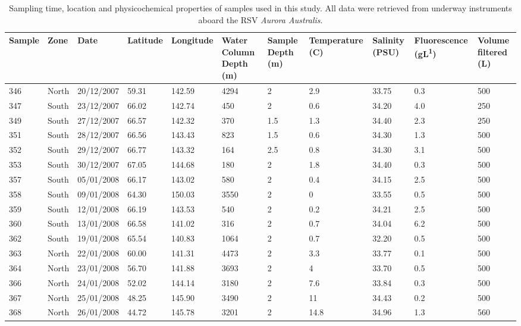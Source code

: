 \begin{sidewaystable}
\sffamily
\caption[Details of samples used in Polar Front study]{\sffamily{}Sampling time, location and physicochemical properties of samples used in this study.
All data were retrieved from underway instruments aboard the RSV \textit{Aurora Australis}.}
\label{tab:samplelist}
\smallskip
\begin{tabularx}{\textheight}{lllXXXXXXXX}
\toprule
\textbf{Sample} & \textbf{Zone} & \textbf{Date} & \textbf{Latitude} & \textbf{Longitude} & \textbf{Water \linebreak Column \linebreak Depth (m)} & \textbf{Sample Depth (m)} & \textbf{Temperature (\textdegree{}C)} & \textbf{Salinity (PSU)} & \textbf{Fluorescence \linebreak (\textmu{}gL\textsuperscript{\textminus{}1})} & \textbf{Volume \linebreak filtered (L)}\\
\midrule

346 & North & 20/12/2007 & \textminus{}59.31 & 142.59 & 4294 & 2 & 2.9 & 33.75 & 0.3 & 500\\
347 & South & 23/12/2007 & \textminus{}66.02 & 142.74 & 450 & 2 & 0.6 & 34.20 & 4.0 & 250\\
349 & South & 27/12/2007 & \textminus{}66.57 & 142.32 & 370 & 1.5 & \textminus{}1.3 & 34.40 & 2.3 & 250\\
351 & South & 28/12/2007 & \textminus{}66.56 & 143.43 & 823 & 1.5 & \textminus{}0.6 & 34.30 & 1.3 & 500\\
352 & South & 29/12/2007 & \textminus{}66.77 & 143.32 & 164 & 2.5 & \textminus{}0.8 & 34.30 & 3.1 & 500\\
353 & South & 30/12/2007 & \textminus{}67.05 & 144.68 & 180 & 2 & \textminus{}1.8 & 34.40 & 0.3 & 500\\
357 & South & 05/01/2008 & \textminus{}66.17 & 143.02 & 580 & 2 & \textminus{}0.4 & 34.15 & 2.5 & 500\\
358 & South & 09/01/2008 & \textminus{}64.30 & 150.03 & 3550 & 2 & 0 & 33.55 & 0.5 & 500\\
359 & South & 12/01/2008 & \textminus{}66.19 & 143.53 & 540 & 2 & \textminus{}0.2 & 34.21 & 2.5 & 500\\
360 & South & 13/01/2008 & \textminus{}66.58 & 141.02 & 316 & 2 & \textminus{}0.7 & 34.04 & 6.2 & 500\\
362 & South & 19/01/2008 & \textminus{}65.54 & 140.83 & 1064 & 2 & 0.7 & 32.20 & 0.5 & 500\\
363 & North & 22/01/2008 & \textminus{}60.00 & 141.31 & 4473 & 2 & 3.3 & 33.77 & 0.1 & 500\\
364 & North & 23/01/2008 & \textminus{}56.70 & 141.88 & 3693 & 2 & 4 & 33.70 & 0.5 & 500\\
366 & North & 24/01/2008 & \textminus{}52.02 & 144.14 & 3180 & 2 & 7.6 & 33.84 & 0.3 & 500\\
367 & North & 25/01/2008 & \textminus{}48.25 & 145.90 & 3490 & 2 & 11 & 34.43 & 0.2 & 500\\
368 & North & 26/01/2008 & \textminus{}44.72 & 145.78 & 3201 & 2 & 14.8 & 34.96 & 1.3 & 560\\

\bottomrule
\end{tabularx}
\end{sidewaystable}
